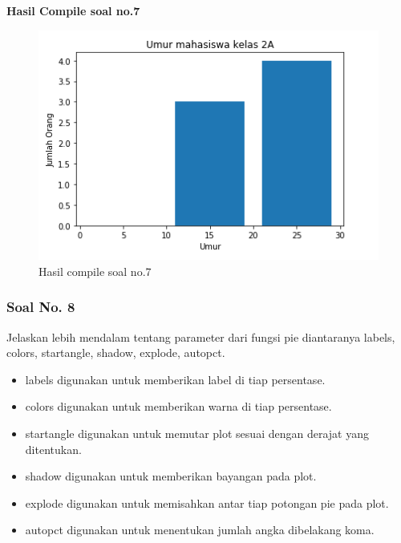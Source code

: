 

\hfill \break
\textbf{Hasil Compile soal no.7}

\begin{figure}[H]
	\includegraphics{figures/6/1174021/7.png}
	\centering
	\caption{Hasil compile soal no.7}
\end{figure}

\subsubsection{Soal No. 8}
\hfill \break
 Jelaskan lebih mendalam tentang parameter dari fungsi pie diantaranya labels, colors, startangle, shadow, explode, autopct.
 
 \begin{itemize}
 	\item labels digunakan untuk memberikan label di tiap persentase.
 	\item colors digunakan untuk memberikan warna di tiap persentase.
 	\item startangle digunakan untuk memutar plot sesuai dengan derajat yang ditentukan.
 	\item shadow digunakan untuk memberikan bayangan pada plot.
 	\item explode digunakan untuk memisahkan antar tiap potongan pie pada plot.
 	\item autopct digunakan untuk menentukan jumlah angka dibelakang koma.
 \end{itemize}
 
 